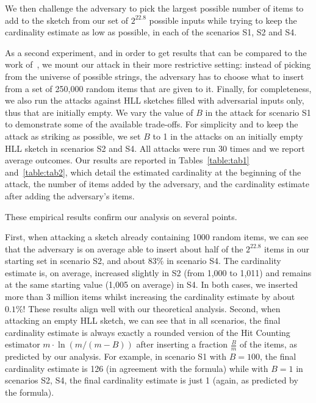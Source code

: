 \documentclass[sigconf, anonymous, dvipsnames]{acmart} %
\begin{document}
We then challenge the adversary to pick the largest possible number of items to add to the sketch from our set of  $2^{22.8}$ possible inputs while trying to keep the cardinality estimate as low as possible, in each of the scenarios S1, S2 and S4. 

As a second experiment, and in order to get results that can be compared to the work of~\cite{hllvuln}, we mount our attack in their more restrictive setting: instead of picking from the universe of possible strings, the adversary has to choose what to insert from a set of 250,000 random items that are given to it. Finally, for completeness, we also run the attacks against HLL sketches filled with adversarial inputs only, thus that are initially empty. We vary the value of $B$ in the attack for scenario S1 to demonstrate some of the available trade-offs. For simplicity and to keep the attack as striking as possible, we set $B$ to 1 in the attacks on an initially empty HLL sketch in scenarios S2 and S4. All attacks were run 30 times and we report average outcomes. Our results are reported in Tables~\ref{table:tab1} and~\ref{table:tab2}, which detail the estimated cardinality at the beginning of the attack, the number of items added by the adversary, and the cardinality estimate after adding the adversary's items.

These empirical results confirm our analysis on several points.

First, when attacking a sketch already containing 1000 random items, we can see that the adversary is on average able to insert about half of the $2^{22.8}$ items in our starting set in scenario S2, and about 83\% in scenario S4. The cardinality estimate is, on average, increased slightly in S2 (from 1,000 to 1,011) and remains at the same starting value (1,005 on average) in S4. In both cases, we inserted more than 3 million items whilst increasing the cardinality estimate by about $0.1\%$!  These results align well with our theoretical analysis.  
Second, when attacking an empty HLL sketch, we can see that in all scenarios, the final cardinality estimate is always exactly a rounded version of the Hit Counting estimator $m \cdot \ln (m/(m-B))$ after inserting a fraction $\frac{B}{m}$ of the items, as predicted by our analysis. For example, in scenario S1 with $B=100$, the final cardinality estimate is 126 (in agreement with the formula) while with $B=1$ in scenarios S2, S4, the final cardinality estimate is just 1 (again, as predicted by the formula).
\end{document}
